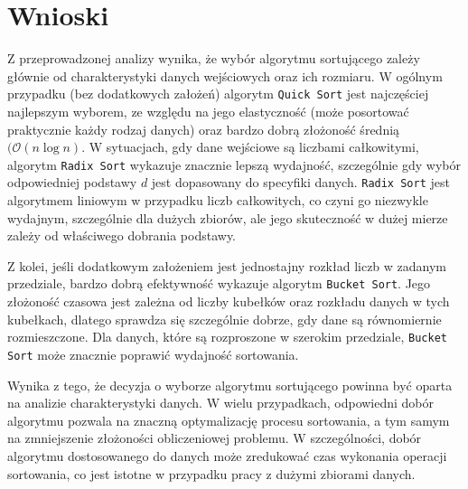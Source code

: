 \documentclass{article}
\newcommand{\bigO}{\mathcal{O}}
\begin{document}
\section{Wnioski}
Z przeprowadzonej analizy wynika, że wybór algorytmu sortującego zależy głównie od charakterystyki danych wejściowych oraz ich rozmiaru. W ogólnym przypadku (bez dodatkowych założeń) algorytm \texttt{Quick Sort} jest najczęściej najlepszym wyborem, ze względu na jego elastyczność (może posortować praktycznie każdy rodzaj danych) oraz bardzo dobrą złożoność średnią $(\bigO(n \log n)$. W sytuacjach, gdy dane wejściowe są liczbami całkowitymi, algorytm \texttt{Radix Sort} wykazuje znacznie lepszą wydajność, szczególnie gdy wybór odpowiedniej podstawy $d$ jest dopasowany do specyfiki danych. \texttt{Radix Sort} jest algorytmem liniowym w przypadku liczb całkowitych, co czyni go niezwykle wydajnym, szczególnie dla dużych zbiorów, ale jego skuteczność w dużej mierze zależy od właściwego dobrania podstawy.

Z kolei, jeśli dodatkowym założeniem jest jednostajny rozkład liczb w zadanym przedziale, bardzo dobrą efektywność wykazuje algorytm \texttt{Bucket Sort}. Jego złożoność czasowa jest zależna od liczby kubełków oraz rozkładu danych w tych kubełkach, dlatego sprawdza się szczególnie dobrze, gdy dane są równomiernie rozmieszczone. Dla danych, które są rozproszone w szerokim przedziale, \texttt{Bucket Sort} może znacznie poprawić wydajność sortowania.

Wynika z tego, że decyzja o wyborze algorytmu sortującego powinna być oparta na analizie charakterystyki danych. W wielu przypadkach, odpowiedni dobór algorytmu pozwala na znaczną optymalizację procesu sortowania, a tym samym na zmniejszenie złożoności obliczeniowej problemu. W szczególności, dobór algorytmu dostosowanego do danych może zredukować czas wykonania operacji sortowania, co jest istotne w przypadku pracy z dużymi zbiorami danych.
\end{document}
